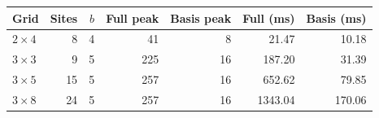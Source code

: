 \begin{tabular}{lrrrrrr}
\toprule
Grid & Sites & $b$ & Full peak & Basis peak & Full (ms) & Basis (ms) \\
\midrule
$2\times 4$ & 8 & 4 & 41 & 8 & 21.47 & 10.18 \\
$3\times 3$ & 9 & 5 & 225 & 16 & 187.20 & 31.39 \\
$3\times 5$ & 15 & 5 & 257 & 16 & 652.62 & 79.85 \\
$3\times 8$ & 24 & 5 & 257 & 16 & 1343.04 & 170.06 \\
\bottomrule
\end{tabular}

